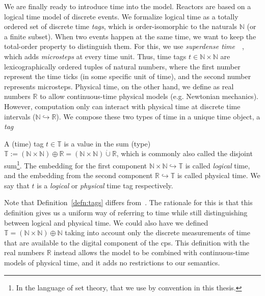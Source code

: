 We are finally ready to introduce time into the model.
Reactors are based on a logical time model of discrete events.
We formalize logical time as a totally ordered set of discrete time \emph{tags}, which is order-isomorphic to the naturals $\mathbb{N}$ (or a finite subset). 
When two events happen at the same time, we want to keep the total-order property to distinguish them.
For this, we use \emph{superdense time}~\cite{superdense,Ptolemaeus:14:SystemDesign}~, which adds \emph{microsteps} at every time unit.
Thus, time tags $t \in \mathbb{N} \times \mathbb{N}$ are lexicographically ordered tuples of natural numbers, where the first number represent the time ticks (in some specific unit of time), and the second number represents microsteps.
Physical time, on the other hand, we define as real numbers $\mathbb{R}$ to allow continuous-time physical models (e.g. Newtonian mechanics).
However, computation only can interact with physical time at discrete time intervals ($\mathbb{N} \hookrightarrow \mathbb{R}$).
We compose these two types of time in a unique time object, a \emph{tag}

\begin{defn}[tag]
    \label{defn:tags}
   A (time) tag $t \in \mathbb{T}$ is a value in the sum (type) $\mathbb{T} := (\mathbb{N} \times \mathbb{N}) \oplus \mathbb{R} = (\mathbb{N} \times \mathbb{N}) \dot{\cup} \mathbb{R}$, which is commonly also called the disjoint sum\footnote{In the language of set theory, that we use by convention in this thesis.}.
   The embedding for the first component $\mathbb{N} \times \mathbb{N} \hookrightarrow \mathbb{T}$ is called \emph{logical} time, and the embedding from the second component $\mathbb{R} \hookrightarrow \mathbb{T}$ is called physical time.
   We say that $t$ is a \emph{logical} or \emph{physical} time tag respectively.
\end{defn}

Note that Definition~\ref{defn:tags} differs from~\cite{lohstroh_cyphy19,lohstroh_phdthesis}.
The rationale for this is that this definition gives us a uniform way of referring to time while still distinguishing between logical and physical time.
We could also have we defined $\mathbb{T} = (\mathbb{N} \times \mathbb{N}) \oplus \mathbb{N}$ taking into account only the discrete measurements of time that are available to the digital component of the \ac{cps}.
This definition with the real numbers $\mathbb{R}$ instead allows the model to be combined with continuous-time models of physical time, and it adds no restrictions to our semantics.

